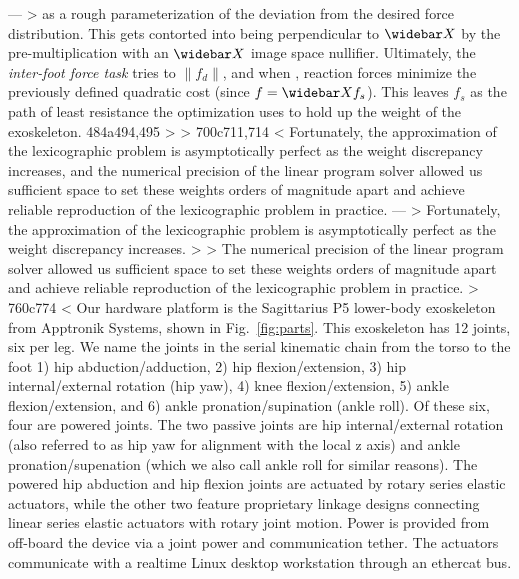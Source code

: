 ---
> as a rough parameterization of the deviation from the desired force distribution. This gets contorted into being perpendicular to $\widebar X$ by the pre-multiplication with an $\widebar X$ image space nullifier. Ultimately, the \emph{inter-foot force task} tries to  $\|f_d\|$, and when , reaction forces minimize the previously defined quadratic cost (since $f = \widebar X f_s$). This leaves $f_s$ as the path of least resistance the optimization uses to hold up the weight of the exoskeleton.
484a494,495
> 
> 
700c711,714
< Fortunately, the approximation of the lexicographic problem is asymptotically perfect as the weight discrepancy increases, and the numerical precision of the linear program solver allowed us sufficient space to set these weights orders of magnitude apart and achieve reliable reproduction of the lexicographic problem in practice.
---
> Fortunately, the approximation of the lexicographic problem is asymptotically perfect as the weight discrepancy increases.
> 
> The numerical precision of the linear program solver allowed us sufficient space to set these weights orders of magnitude apart and achieve reliable reproduction of the lexicographic problem in practice.
> 
760c774
< Our hardware platform is the Sagittarius P5 lower-body exoskeleton from Apptronik Systems, shown in Fig.~\ref{fig:parts}. This exoskeleton has 12 joints, six per leg. We name the joints in the serial kinematic chain from the torso to the foot 1) hip abduction/adduction, 2) hip flexion/extension, 3) hip internal/external rotation (hip yaw), 4) knee flexion/extension, 5) ankle flexion/extension, and 6) ankle pronation/supination (ankle roll). Of these six, four are powered joints. The two passive joints are hip internal/external rotation (also referred to as hip yaw for alignment with the local z axis) and ankle pronation/supenation (which we also call ankle roll for similar reasons). The powered hip abduction and hip flexion joints are actuated by rotary series elastic actuators, while the other two feature proprietary linkage designs connecting linear series elastic actuators with rotary joint motion. Power is provided from off-board the device via a joint power and communication tether. The actuators communicate with a realtime Linux desktop workstation through an ethercat bus.
